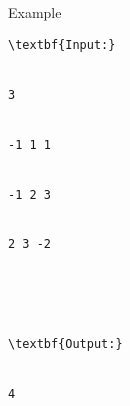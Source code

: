 Example
\begin{verbatim}
\textbf{Input:}


3


-1 1 1


-1 2 3


2 3 -2





\textbf{Output:}


4


\end{verbatim}